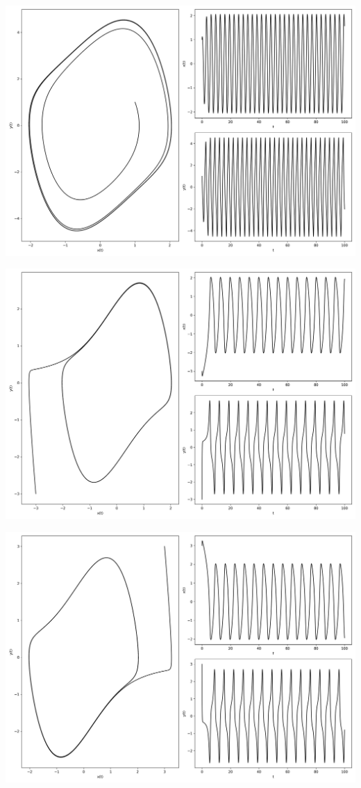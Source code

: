 \documentclass[12pt,a4paper]{jsarticle}
\makeatletter
\def\figcaption{\def\@captype{figure}\caption}
\makeatother
\begin{document}
\figcaption{$x_0=1,00, y_0=1.00, \mu=1.00, \omega=0.00, T = 100, N = 10000$}
\includegraphics[scale=0.33]{x1,0y1,0mu1,0omega2,0t1,00e+02n1,00e+04.png}
\figcaption{$x_0=1,00, y_0=1.00, \mu=1.00, \omega=2.00, T = 100, N = 10000$}
\includegraphics[scale=0.33]{x-3,0y-3,0mu1,0omega1,0t1,00e+02n1,00e+04.png}
\figcaption{$x_0=-3.00, y_0=-3.00, \mu=1,00, \omega=1.00, T = 100, N = 10000$}
\includegraphics[scale=0.33]{x3,0y3,0mu1,0omega1,0t1,00e+02n1,00e+04.png}
\end{document}
